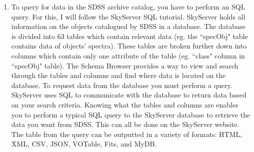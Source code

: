 \documentclass[10pt,letterpaper]{article}
\begin{document}
\begin{enumerate}
\item To query for data in the SDSS archive catalog, you have to perform an SQL query. For this, I will follow the SkyServer SQL tutorial. SkyServer holds all information on the objects catalogued by SDSS in a database. The database is divided into 63 tables which contain relevant data (eg. the ``specObj" table contains data of objects' spectra). These tables are broken further down into columns which contain only one attribute of the table (eg. ``class" column in ``specObj" table). The Schema Browser \cite{schema} provides a way to view and search through the tables and columns and find where data is located on the database. To request data from the database you must perform a query. SkyServer uses SQL to communicate with the database to return data based on your search criteria. Knowing what the tables and columns are enables you to perform a typical SQL query to the SkyServer database to retrieve the data you want from SDSS. This can all be done on the SkyServer website. The table from the query can be outputted in a variety of formats: HTML, XML, CSV, JSON, VOTable, Fits, and MyDB.\cite{SQL tutorial}
\end{enumerate}
\end{document}
